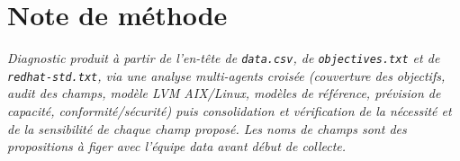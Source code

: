 \documentclass[11pt,a4paper]{article}
\newcommand{\code}[1]{\texttt{#1}}
\begin{document}
\section*{Note de m\'ethode}
\small\itshape
Diagnostic produit \`a partir de l'en-t\^ete de \code{data.csv}, de \code{objectives.txt} et de
\code{redhat-std.txt}, via une analyse multi-agents crois\'ee (couverture des objectifs, audit des
champs, mod\`ele LVM AIX/Linux, mod\`eles de r\'ef\'erence, pr\'evision de capacit\'e,
conformit\'e/s\'ecurit\'e) puis consolidation et v\'erification de la n\'ecessit\'e et de la
sensibilit\'e de chaque champ propos\'e. Les noms de champs sont des propositions \`a figer avec
l'\'equipe data avant d\'ebut de collecte.
\end{document}
